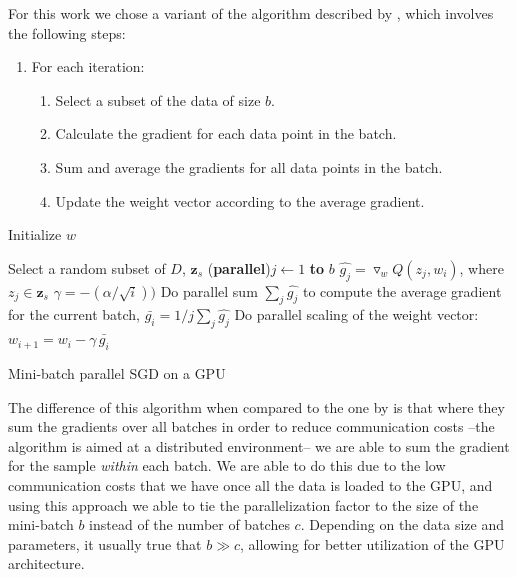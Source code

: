 \documentclass[11pt,a4paper]{article}
\begin{document}
For this work we chose a variant of the algorithm described by \cite{dekel2012optimal}, which involves the following steps:
\begin{enumerate}
	\item  	For each iteration:
	\begin{enumerate}
		\item Select a subset of the data of size $b$.
		\item Calculate the gradient for each data point in the batch.
		\item Sum and average the gradients for all data points in the batch.
		\item Update the weight vector according to the average gradient.
	\end{enumerate}
\end{enumerate}

\begin{algorithm}
	\DontPrintSemicolon %
	Initialize $w$\;
	 {
		Select a random subset of $D$, $\mathbf{z}_s$\;
		\For(\textbf{parallel}){$j \gets 1$ \textbf{to} $b$} {
			$\hat{g_j} = \triangledown_w Q(z_j, w_i)$, where $z_j \in \mathbf{z}_s$\;
		}
		$\gamma = -(\alpha / \sqrt{i}))$\;
		Do parallel sum $\sum_j{\hat{g_j}}$ to compute the average gradient for the current batch, $\bar{g_i} = 1/j \sum_j{\hat{g_j}}$\;
		Do parallel scaling of the weight vector: $w_{i + 1} = w_i - \gamma \,  \bar{g_i}$\;
		
	}
	\;
	\caption{Mini-batch parallel SGD on a GPU}
	\label{algo:sgd-gpu}
\end{algorithm}

The difference of this algorithm when compared to the one by \cite{dekel2012optimal} is that where they sum the gradients over all batches in order to reduce communication costs --the algorithm is aimed at a distributed environment-- we are able to sum the gradient for the sample \textit{within} each batch. We are able to do this due to the low communication costs that we have once all the data is loaded to the GPU, and using this approach we able to tie the parallelization factor to the size of the mini-batch $b$ instead of the number of batches $c$. Depending on the data size and parameters, it usually true that $b \gg c$, allowing for better utilization of the GPU architecture.
\end{document}
